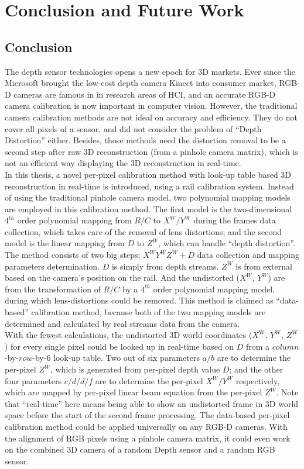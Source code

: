 \chapter{Conclusion and Future Work} %
\label{sens_ConclusionAndFutureWork} 

\section{Conclusion}
The depth sensor technologies opens a new epoch for 3D markets. Ever since the Microsoft brought the low-cost depth camera Kinect into consumer market, RGB-D cameras are famous in in research areas of HCI, and an accurate RGB-D camera calibration is now important in computer vision. However, the traditional camera calibration methods are not ideal on accuracy and efficiency. They do not cover all pixels of a sensor, and did not consider the problem of \enquote{Depth Distortion} either. Besides, those methods need the distortion removal to be a second step after raw 3D reconstruction (from a pinhole camera matrix), which is not an efficient way displaying the 3D reconstruction in real-time.
\\\indent
In this thesis, a novel per-pixel calibration method with look-up table based 3D reconstruction in real-time is introduced, using a rail calibration system. Instead of using the traditional pinhole camera model, two polynomial mapping models are employed in this calibration method. The first model is the two-dimensional \(4^{th}\) order polynomial mapping from \(R/C\) to \(X^W/Y^W\) during the frames data collection, which takes care of the removal of lens distortions; and the second model is the linear mapping from \(D\) to \(Z^W\), which can handle \enquote{depth distortion}. The method consists of two big steps: \(X^WY^WZ^W+D\) data collection and mapping parameters determination. \(D\) is simply from depth streams. \(Z^W\) is from external based on the camera's position on the rail. And the undistorted (\(X^W, \, Y^W\)) are from the transformation of \(R/C\) by a \(4^{th}\) order polynomial mapping model, during which lens-distortions could be removed. This method is claimed as \enquote{data-based} calibration method, because both of the two mapping models are determined and calculated by real streams data from the camera. 
\\\indent
With the fewest calculations, the undistorted 3D world coordinates (\(X^\text{W}, \, Y^\text{W}, \, Z^\text{W}\)) for every single pixel could be looked up in real-time based on \(D\) from a \(column\)-by-\(row\)-by-\(6\) look-up table. Two out of six parameters \(a/b\) are to determine the per-pixel \(Z^W\), which is generated from per-pixel depth value \(D\); and the other four parameters \(c/d/d/f\) are to determine the per-pixel \(X^W/Y^W\) respectively, which are mapped by per-pixel linear beam equation from the per-pixel \(Z^W\). Note that \enquote{real-time} here means being able to show an undistorted frame in 3D world space before the start of the second frame processing. The data-based per-pixel calibration method could be applied universally on any RGB-D cameras. With the alignment of RGB pixels using a pinhole camera matrix, it could even work on the combined 3D camera of a random Depth sensor and a random RGB sensor.
